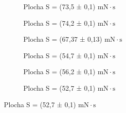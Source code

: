 \begin{figure}[H]
        \centering

        \begin{subfigure}[t]{0.3\textwidth}
            \centering
            
            \caption{
                Plocha S = (73,5 ± 0,1) $\mathrm{mN \cdot s}$
            }
            \label{fig:integrales-1a}
        \end{subfigure}%
    \hfill
\begin{subfigure}[t]{0.3\textwidth}
            \centering
            
            \caption{
                Plocha S = (74,2 ± 0,1) $\mathrm{mN \cdot s}$
            }
            \label{fig:integrales-1b}
        \end{subfigure}%
    \hfill
\begin{subfigure}[t]{0.3\textwidth}
            \centering
            
            \caption{
                Plocha S = (67,37 ± 0,13) $\mathrm{mN \cdot s}$
            }
            \label{fig:integrales-1c}
        \end{subfigure}

    \vspace{0.5em}
\begin{subfigure}[t]{0.3\textwidth}
            \centering
            
            \caption{
                Plocha S = (54,7 ± 0,1) $\mathrm{mN \cdot s}$
            }
            \label{fig:integrales-1d}
        \end{subfigure}%
    \hfill
\begin{subfigure}[t]{0.3\textwidth}
            \centering
            
            \caption{
                Plocha S = (56,2 ± 0,1) $\mathrm{mN \cdot s}$
            }
            \label{fig:integrales-1e}
        \end{subfigure}%
    \hfill
\begin{subfigure}[t]{0.3\textwidth}
            \centering
            
            \caption{
                Plocha S = (52,7 ± 0,1) $\mathrm{mN \cdot s}$
            }
            \label{fig:integrales-1f}
        \end{subfigure}


\end{figure}
